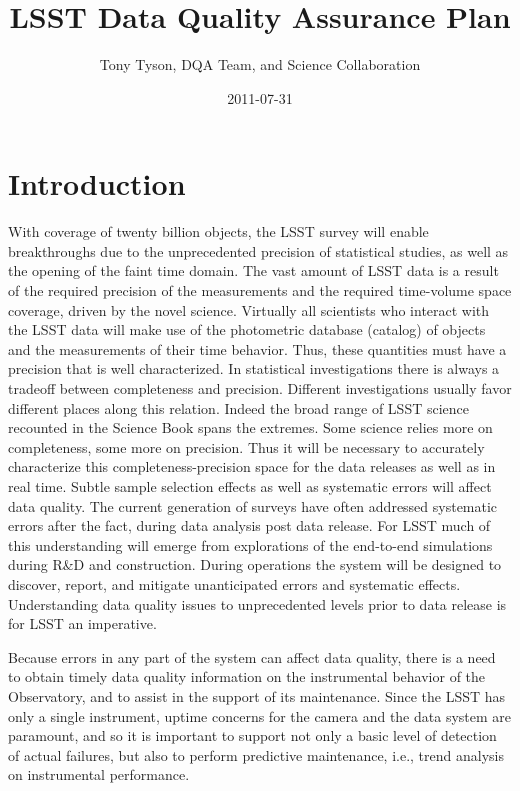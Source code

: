 \documentclass[SE,toc]{lsstdoc}
\title{LSST Data Quality Assurance Plan}
\author{Tony Tyson, DQA Team, and Science Collaboration}
\date{2011-07-31}
\begin{document}
\maketitle

\section{Introduction}

With coverage of twenty billion objects, the LSST survey will enable breakthroughs due to the unprecedented precision of statistical studies, as well as the opening of the faint time domain. The vast amount of LSST data is a result of the required precision of the measurements and the required time-volume space coverage, driven by the novel science. Virtually all scientists who interact with the LSST data will make use of the photometric database (catalog) of objects and the measurements of their time behavior. Thus, these quantities must have a precision that is well characterized.  In statistical investigations there is always a tradeoff between completeness and precision. Different investigations usually favor different places along this relation.  Indeed the broad range of LSST science recounted in the Science Book spans the extremes. Some science relies more on completeness, some more on precision. Thus it will be necessary to accurately characterize this completeness-precision space for the data releases as well as in real time. Subtle sample selection effects as well as systematic errors will affect data quality. The current generation of surveys have often addressed systematic errors after the fact, during data analysis post data release. For LSST much of this understanding will emerge from explorations of the end-to-end simulations during R\&D and construction.  During operations the system will be designed to discover, report, and mitigate unanticipated errors and systematic effects.  Understanding data quality issues to unprecedented levels prior to data release is for LSST an imperative.

Because errors in any part of the system can affect data quality, there is a need to obtain timely data quality information on the instrumental behavior of the Observatory, and to assist in the support of its maintenance. Since the LSST has only a single instrument, uptime concerns for the camera and the data system are paramount, and so it is important to support not only a basic level of detection of actual failures, but also to perform predictive maintenance, i.e., trend analysis on instrumental performance.
\end{document}
